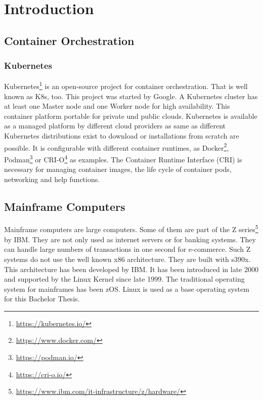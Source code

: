 \chapter{Introduction}\label{ch:intro}


\blindtext

\section{Container Orchestration}

\blindtext

\subsection{Kubernetes}

Kubernetes\footnote{\url{https://kubernetes.io/}} is an open-source project for container orchestration. That is well known as K8s, too. This project was started by Google. A Kubernetes cluster has at least one Master node and one Worker node for high availability. This container platform portable for private und public clouds. Kubernetes is available as a managed platform by different cloud providers as same as different Kubernetes distributions exist to download or installations from scratch are possible. It is configurable with different container runtimes, as Docker\footnote{\url{https://www.docker.com/}}, Podman\footnote{\url{https://podman.io/}} or CRI-O\footnote{\url{https://cri-o.io/}} as examples. The Container Runtime Interface (CRI) is necessary for managing container images, the life cycle of container pods, networking and help functions\cite[~p.16]{Scholl2019}. 
\blindtext

\section{Mainframe Computers}

Mainframe computers are large computers. Some of them are part of the Z series\footnote{\url{https://www.ibm.com/it-infrastructure/z/hardware/}} by IBM. They are not only used as internet servers or for banking systems. They can handle large numbers of transactions in one second for e-commerce\cite[~p.56]{Tanenbaum2014}. Such Z systems do not use the well known x86 architecture. They are built with s390x. This architecture has been developed by IBM. It has been introduced in late 2000 and supported by the Linux Kernel since late 1999\cite[~p.15]{Block2019}. The traditional operating system for mainframes has been z\/OS. Linux is used as a base operating system for this Bachelor Thesis.


